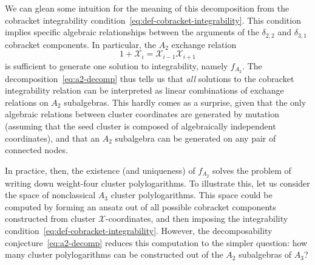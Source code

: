 \documentclass[12pt]{article}
\def\x{\mathcal{X}}
\def\xcoords{$\mathcal{X}$-coordinates}
\begin{document}
We can glean some intuition for the meaning of this decomposition from the cobracket integrability condition~\eqref{eq:def-cobracket-integrability}. This condition implies specific algebraic relationships between the arguments of the $\delta_{2,2}$ and $\delta_{3,1}$ cobracket components. In particular, the $A_2$ exchange relation
\begin{equation}
	1+\x_i = \x_{i-1}\x_{i+1}
\end{equation}
is sufficient to generate one solution to integrability, namely $f_{A_2}$. The decomposition~\eqref{eq:a2-decomp} thus tells us that \emph{all} solutions to the cobracket integrability relation can be interpreted as linear combinations of exchange relations on $A_2$ subalgebras. This hardly comes as a surprise, given that the only algebraic relations between cluster coordinates are generated by mutation (assuming that the seed cluster is composed of algebraically independent coordinates), and that an $A_2$ subalgebra can be generated on any pair of connected nodes.

In practice, then, the existence (and uniqueness) of $f_{A_2}$ solves the problem of writing down weight-four cluster polylogarithms. To illustrate this, let us consider the space of nonclassical $A_3$ cluster polylogarithms. This space could be computed by forming an ansatz out of all possible cobracket components constructed from cluster \xcoords, and then imposing the integrability condition~\eqref{eq:def-cobracket-integrability}. However, the decomposability conjecture~\eqref{eq:a2-decomp} reduces this computation to the simpler question: how many cluster polylogarithms can be constructed out of the $A_2$ subalgebras of $A_3$? 
\end{document}
